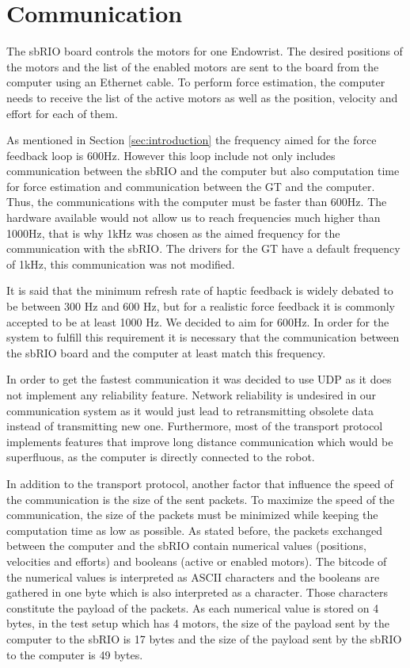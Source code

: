 \section{Communication}


The sbRIO board controls the motors for one Endowrist. The desired positions of the motors and the list of the enabled motors are sent to the board from the computer using an Ethernet cable. To perform force estimation, the computer needs to receive the list of the active motors as well as the position, velocity and effort for each of them.

{\color{green}
As mentioned in Section \ref{sec:introduction} the frequency aimed for the force feedback loop is 600Hz. However this loop include not only includes communication between the sbRIO and the computer but also computation time for force estimation and communication between the GT and the computer. Thus, the communications with the computer must be faster than 600Hz. The hardware available would not allow us to reach frequencies much higher than 1000Hz, that is why 1kHz was chosen as the aimed frequency for the communication with the sbRIO. The drivers for the GT have a default frequency of 1kHz, this communication was not modified.
}

{\color{red}
It is said that the minimum refresh rate of haptic feedback is widely debated to
be between 300 Hz and 600 Hz, but for a realistic force feedback it is commonly accepted
to be at least 1000 Hz\cite{coles2011role}. We decided to aim for 600Hz. In order for the system to fulfill this requirement it is necessary that the communication between the sbRIO board and the computer at least match this frequency.%
}

In order to get the fastest communication it was decided to use UDP as it does not implement any reliability feature. Network reliability is undesired in our communication system as it would just lead to retransmitting obsolete data instead of transmitting new one. Furthermore, most of the transport protocol implements features that improve long distance communication which would be superfluous, as the computer is directly connected to the robot.
 
In addition to the transport protocol, another factor that influence the speed of the communication is the size of the sent packets. To maximize the speed of the communication, the size of the packets must be minimized while keeping the computation time as low as possible. As stated before, the packets exchanged between the computer and the sbRIO contain numerical values (positions, velocities and efforts) and booleans (active or enabled motors). The bitcode of the numerical values is interpreted as ASCII characters and the booleans are gathered in one byte which is also interpreted as a character. Those characters constitute the payload of the packets. As each numerical value is stored on 4 bytes, in the test setup which has 4 motors, the size of the payload sent by the computer to the sbRIO is 17 bytes and the size of the payload sent by the sbRIO to the computer is 49 bytes.

